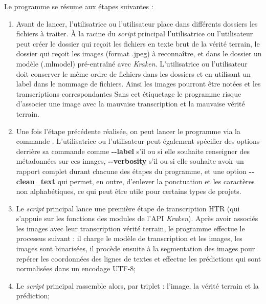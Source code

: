 Le programme se résume aux étapes suivantes :
\begin{enumerate}
    \item Avant de lancer, l'utilisatrice ou l'utilisateur place dans différents dossiers les fichiers à traiter. À la racine du \textit{script} principal  l'utilisatrice ou l'utilisateur peut créer le dossier  qui reçoit les fichiers en texte brut de la vérité terrain, le dossier  qui reçoit les images (format .jpeg) à reconnaître, et dans le dossier  un modèle (.mlmodel) pré-entraîné avec \textit{Kraken}. L'utilisatrice ou l'utilisateur doit conserver le même ordre de fichiers dans les dossiers  et  en utilisant un label dans le nommage de fichiers. Ainsi les images pourront être notées  et les transcriptions correspondantes  Sans cet étiquetage le programme risque d'associer une image avec la mauvaise transcription et la mauvaise vérité terrain.\\
    \item Une fois l'étape précédente réalisée, on peut lancer le programme via la commande . L'utilisatrice ou l'utilisateur peut également spécifier des options derrière sa commande comme \textbf{-{}-label} s'il ou si elle souhaite renseigner des métadonnées sur ces images, \textbf{-{}-verbosity} s'il ou si elle souhaite avoir un rapport complet durant chacune des étapes du programme, et une option \textbf{-{}-clean\_text} qui permet, en outre, d'enlever la ponctuation et les caractères non alphabétiques, ce qui peut être utile pour certains types de projets.\\
    \item Le \textit{script} principal  lance une première étape de transcription HTR (qui s'appuie sur les fonctions des modules de l'API \textit{Kraken}). Après avoir associés les images avec leur transcription vérité terrain, le programme effectue le processus suivant : il charge le modèle de transcription et les images, les images sont binarisées, il procède ensuite à la segmentation des images pour repérer les coordonnées des lignes de textes et effectue les prédictions qui sont normalisées dans un encodage UTF-8;
    \item Le \textit{script} principal  rassemble alors, par triplet : l'image, la vérité terrain et la prédiction;

\end{enumerate}
